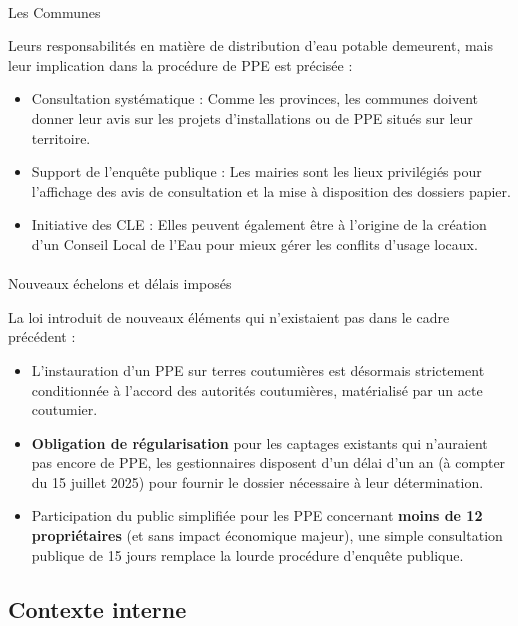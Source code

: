 \documentclass[
  11pt,
]{article}
\makeatletter
\let\oldparagraph\paragraph
\renewcommand{\paragraph}{
    \@ifstar
      \xxxParagraphStar
      \xxxParagraphNoStar
  }
\newcommand{\xxxParagraphStar}[1]{\oldparagraph*{#1}\mbox{}}
\newcommand{\xxxParagraphNoStar}[1]{\oldparagraph{#1}\mbox{}}
\providecommand{\tightlist}{%
  \setlength{\itemsep}{0pt}\setlength{\parskip}{0pt}}\usepackage{longtable,booktabs,array}
\makeatother
\begin{document}
\paragraph{Les Communes}\label{les-communes}

Leurs responsabilités en matière de distribution d'eau potable
demeurent, mais leur implication dans la procédure de PPE est précisée :

\begin{itemize}
\tightlist
\item
  Consultation systématique : Comme les provinces, les communes doivent
  donner leur avis sur les projets d'installations ou de PPE situés sur
  leur territoire.
\item
  Support de l'enquête publique : Les mairies sont les lieux privilégiés
  pour l'affichage des avis de consultation et la mise à disposition des
  dossiers papier.
\item
  Initiative des CLE : Elles peuvent également être à l'origine de la
  création d'un Conseil Local de l'Eau pour mieux gérer les conflits
  d'usage locaux.
\end{itemize}

\paragraph{Nouveaux échelons et délais
imposés}\label{nouveaux-uxe9chelons-et-duxe9lais-imposuxe9s}

La loi introduit de nouveaux éléments qui n'existaient pas dans le cadre
précédent :

\begin{itemize}
\tightlist
\item
  L'instauration d'un PPE sur terres coutumières est désormais
  strictement conditionnée à l'accord des autorités coutumières,
  matérialisé par un acte coutumier.
\item
  \textbf{Obligation de régularisation} pour les captages existants qui
  n'auraient pas encore de PPE, les gestionnaires disposent d'un délai
  d'un an (à compter du 15 juillet 2025) pour fournir le dossier
  nécessaire à leur détermination.
\item
  Participation du public simplifiée pour les PPE concernant
  \textbf{moins de 12 propriétaires} (et sans impact économique majeur),
  une simple consultation publique de 15 jours remplace la lourde
  procédure d'enquête publique.
\end{itemize}

\subsection{Contexte interne}\label{contexte-interne}
\end{document}

